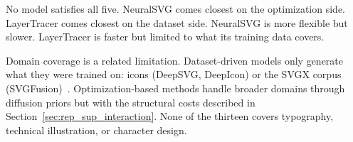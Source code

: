 No model satisfies all five. NeuralSVG comes closest 
on the optimization side. LayerTracer comes closest on 
the dataset side. NeuralSVG is more flexible but slower. 
LayerTracer is faster but limited to what its training 
data covers.

Domain coverage is a related limitation. Dataset-driven 
models only generate what they were trained on: icons 
(DeepSVG, DeepIcon) or 
the SVGX corpus 
(SVGFusion)~\cite{carlierDeepSVGHierarchicalGenerative2020, 
bingDeepIconHierarchicalNetwork2024, 
xingSVGFusionScalableTexttoSVG2025}. Optimization-based 
methods handle broader domains through diffusion priors 
but with the structural costs described in 
Section~\ref{sec:rep_sup_interaction}. None of the 
thirteen covers typography, technical illustration, or 
character design.




